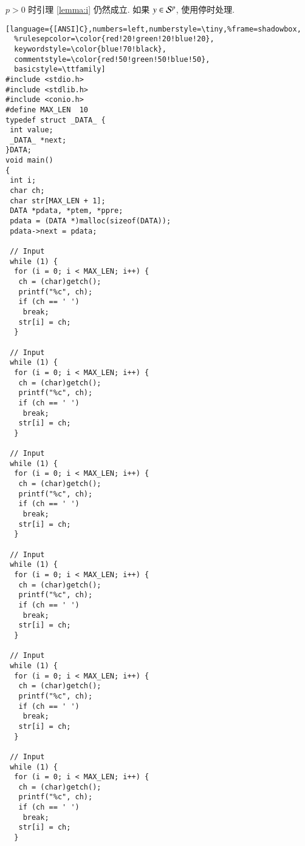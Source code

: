 \begin{remark}
  $p>0$ 时引理 \ref{lemma:i} 仍然成立. 如果 $y\in\mathcal{S}^p$, 使用停时处理.
\end{remark}



\begin{lstlisting}[language={[ANSI]C},numbers=left,numberstyle=\tiny,%frame=shadowbox,
  %rulesepcolor=\color{red!20!green!20!blue!20},
  keywordstyle=\color{blue!70!black},
  commentstyle=\color{red!50!green!50!blue!50},
  basicstyle=\ttfamily]
#include <stdio.h>
#include <stdlib.h>
#include <conio.h>
#define MAX_LEN  10
typedef struct _DATA_ {
 int value;
 _DATA_ *next;
}DATA;
void main()
{
 int i;
 char ch;
 char str[MAX_LEN + 1];
 DATA *pdata, *ptem, *ppre;
 pdata = (DATA *)malloc(sizeof(DATA));
 pdata->next = pdata;

 // Input
 while (1) {
  for (i = 0; i < MAX_LEN; i++) {
   ch = (char)getch();
   printf("%c", ch);
   if (ch == ' ')
    break;
   str[i] = ch;
  }

 // Input
 while (1) {
  for (i = 0; i < MAX_LEN; i++) {
   ch = (char)getch();
   printf("%c", ch);
   if (ch == ' ')
    break;
   str[i] = ch;
  }

 // Input
 while (1) {
  for (i = 0; i < MAX_LEN; i++) {
   ch = (char)getch();
   printf("%c", ch);
   if (ch == ' ')
    break;
   str[i] = ch;
  }

 // Input
 while (1) {
  for (i = 0; i < MAX_LEN; i++) {
   ch = (char)getch();
   printf("%c", ch);
   if (ch == ' ')
    break;
   str[i] = ch;
  }

 // Input
 while (1) {
  for (i = 0; i < MAX_LEN; i++) {
   ch = (char)getch();
   printf("%c", ch);
   if (ch == ' ')
    break;
   str[i] = ch;
  }

 // Input
 while (1) {
  for (i = 0; i < MAX_LEN; i++) {
   ch = (char)getch();
   printf("%c", ch);
   if (ch == ' ')
    break;
   str[i] = ch;
  }
\end{lstlisting}